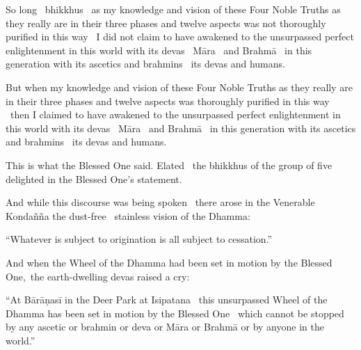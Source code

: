 \begin{english-hang}
  So long \breathmark\ bhikkhus \breathmark\ as my knowledge and vision of these Four Noble Truths as they really are in their three phases and twelve aspects was not thoroughly purified in this way \breathmark\ I did not claim to have awakened to the unsurpassed perfect enlightenment in this world with its devas \breathmark\ Māra \breathmark\ and Brahmā \breathmark\ in this generation with its ascetics and brahmins \breathmark\ its devas and humans.
\end{english-hang}

\begin{english-hang}
  But when my knowledge and vision of these Four Noble Truths as they really are in their three phases and twelve aspects was thoroughly purified in this way \breathmark\ then I claimed to have awakened to the unsurpassed perfect enlightenment in this world with its devas \breathmark\ Māra \breathmark\ and Brahmā \breathmark\ in this generation with its ascetics and brahmins \breathmark\ its devas and humans.
\end{english-hang}

\begin{english-hang}
  This is what the Blessed One said. Elated \breathmark\ the bhikkhus of the group of five delighted in the Blessed One's statement.
\end{english-hang}

\begin{english-hang}
  And while this discourse was being spoken \breathmark\ there arose in the Venerable Kondañña the dust-free \breathmark\ stainless vision of the Dhamma:
\end{english-hang}

\begin{english-hang}
  ``Whatever is subject to origination is all subject to cessation.''
\end{english-hang}

\begin{english-hang}
  And when the Wheel of the Dhamma had been set in motion by the Blessed One, the earth-dwelling devas raised a cry:
\end{english-hang}

\begin{english-hang}
  ``At Bārāṇasī in the Deer Park at Isipatana \breathmark\ this unsurpassed Wheel of the Dhamma has been set in motion by the Blessed One \breathmark\ which cannot be stopped by any ascetic or brahmin or deva or Māra or Brahmā or by anyone in the world.''
\end{english-hang}

